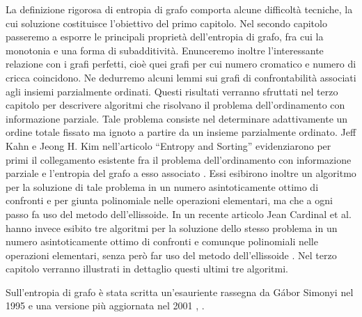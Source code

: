 La definizione rigorosa di entropia di grafo comporta alcune difficoltà 
tecniche, la cui soluzione costituisce l'obiettivo del primo capitolo. Nel 
secondo capitolo passeremo a esporre le principali proprietà dell'entropia di 
grafo, fra cui la monotonia e una forma di subadditività. Enunceremo inoltre 
l'interessante relazione con i grafi perfetti, cioè quei grafi per cui numero 
cromatico e numero di cricca coincidono. Ne dedurremo alcuni lemmi sui grafi 
di confrontabilità associati agli insiemi parzialmente ordinati. Questi 
risultati verranno sfruttati nel terzo capitolo per descrivere algoritmi che 
risolvano il problema dell'ordinamento con informazione parziale. Tale 
problema consiste nel determinare adattivamente un ordine totale fissato ma 
ignoto a partire da un insieme parzialmente ordinato. Jeff Kahn e Jeong H. Kim 
nell'articolo ``Entropy and Sorting'' evidenziarono per primi il collegamento 
esistente fra il problema dell'ordinamento con informazione parziale e 
l'entropia del grafo a esso associato \cite{Kahn1995}. Essi esibirono inoltre 
un algoritmo per la soluzione di tale problema in un numero asintoticamente 
ottimo di confronti e per giunta polinomiale nelle operazioni elementari, ma 
che a ogni passo fa uso del metodo dell'ellissoide. In un recente articolo 
Jean Cardinal et al. hanno invece esibito tre algoritmi per la soluzione dello 
stesso problema in un numero asintoticamente ottimo di confronti e comunque 
polinomiali nelle operazioni elementari, senza però far uso del metodo 
dell'ellissoide \cite{Cardinal2010}. Nel terzo capitolo verranno illustrati in 
dettaglio questi ultimi tre algoritmi.

Sull'entropia di grafo è stata scritta un'esauriente rassegna da G\'abor 
Simonyi nel 1995 e una versione più aggiornata nel 2001 \cite{Simonyi1995}, 
\cite{Simonyi2001}.
